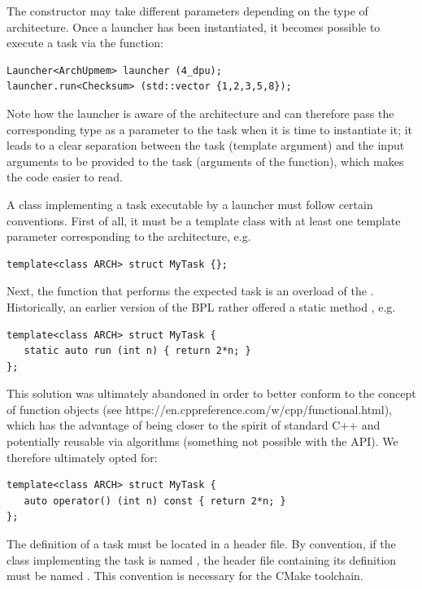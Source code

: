 The constructor may take different parameters depending on the type of architecture. Once a launcher has been instantiated, it becomes possible to execute a task via the  function:

\begin{verbatim}
Launcher<ArchUpmem> launcher (4_dpu);
launcher.run<Checksum> (std::vector {1,2,3,5,8});
\end{verbatim}

Note how the launcher is aware of the architecture and can therefore pass the corresponding type as a parameter to the task when it is time to instantiate it; 
it leads to a clear separation between the task (template argument) and the input arguments to be provided to the task (arguments of the  function), which makes the code easier to read.

A class implementing a task executable by a launcher must follow certain conventions. First of all, it must be a template class with at least one template parameter corresponding to the architecture, e.g.

\begin{verbatim}
template<class ARCH> struct MyTask {};
\end{verbatim}
	
Next, the function that performs the expected task is an overload of the . Historically, an earlier version  of the BPL rather offered a static method , e.g.

\begin{verbatim}
template<class ARCH> struct MyTask {
   static auto run (int n) { return 2*n; }
};
\end{verbatim}

This solution was ultimately abandoned in order to better conform to the concept of function objects  (see https://en.cppreference.com/w/cpp/functional.html), which has the advantage of being closer to  the spirit of standard C++ and potentially reusable via  algorithms (something not possible with the  API). We therefore ultimately opted for:

\begin{verbatim}
template<class ARCH> struct MyTask {
   auto operator() (int n) const { return 2*n; }
};
\end{verbatim}

The definition of a task must be located in a header file. By convention, if the class implementing the task is named , the header file containing its definition must be named . This convention is necessary for the CMake toolchain.

